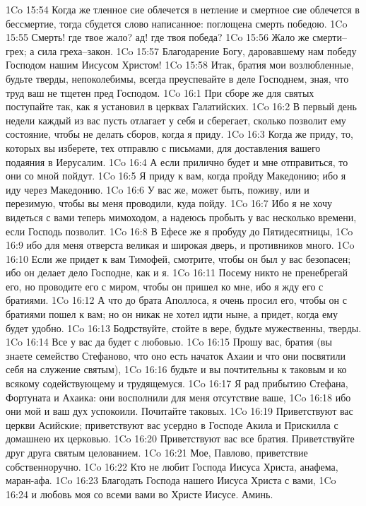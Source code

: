 1Co 15:54  Когда же тленное сие облечется в нетление и смертное сие облечется в бессмертие, тогда сбудется слово написанное: поглощена смерть победою.
1Co 15:55  Смерть! где твое жало? ад! где твоя победа?
1Co 15:56  Жало же смерти--грех; а сила греха--закон.
1Co 15:57  Благодарение Богу, даровавшему нам победу Господом нашим Иисусом Христом!
1Co 15:58  Итак, братия мои возлюбленные, будьте тверды, непоколебимы, всегда преуспевайте в деле Господнем, зная, что труд ваш не тщетен пред Господом.
1Co 16:1  При сборе же для святых поступайте так, как я установил в церквах Галатийских.
1Co 16:2  В первый день недели каждый из вас пусть отлагает у себя и сберегает, сколько позволит ему состояние, чтобы не делать сборов, когда я приду.
1Co 16:3  Когда же приду, то, которых вы изберете, тех отправлю с письмами, для доставления вашего подаяния в Иерусалим.
1Co 16:4  А если прилично будет и мне отправиться, то они со мной пойдут.
1Co 16:5  Я приду к вам, когда пройду Македонию; ибо я иду через Македонию.
1Co 16:6  У вас же, может быть, поживу, или и перезимую, чтобы вы меня проводили, куда пойду.
1Co 16:7  Ибо я не хочу видеться с вами теперь мимоходом, а надеюсь пробыть у вас несколько времени, если Господь позволит.
1Co 16:8  В Ефесе же я пробуду до Пятидесятницы,
1Co 16:9  ибо для меня отверста великая и широкая дверь, и противников много.
1Co 16:10  Если же придет к вам Тимофей, смотрите, чтобы он был у вас безопасен; ибо он делает дело Господне, как и я.
1Co 16:11  Посему никто не пренебрегай его, но проводите его с миром, чтобы он пришел ко мне, ибо я жду его с братиями.
1Co 16:12  А что до брата Аполлоса, я очень просил его, чтобы он с братиями пошел к вам; но он никак не хотел идти ныне, а придет, когда ему будет удобно.
1Co 16:13  Бодрствуйте, стойте в вере, будьте мужественны, тверды.
1Co 16:14  Все у вас да будет с любовью.
1Co 16:15  Прошу вас, братия (вы знаете семейство Стефаново, что оно есть начаток Ахаии и что они посвятили себя на служение святым),
1Co 16:16  будьте и вы почтительны к таковым и ко всякому содействующему и трудящемуся.
1Co 16:17  Я рад прибытию Стефана, Фортуната и Ахаика: они восполнили для меня отсутствие ваше,
1Co 16:18  ибо они мой и ваш дух успокоили. Почитайте таковых.
1Co 16:19  Приветствуют вас церкви Асийские; приветствуют вас усердно в Господе Акила и Прискилла с домашнею их церковью.
1Co 16:20  Приветствуют вас все братия. Приветствуйте друг друга святым целованием.
1Co 16:21  Мое, Павлово, приветствие собственноручно.
1Co 16:22  Кто не любит Господа Иисуса Христа, анафема, маран-афа.
1Co 16:23  Благодать Господа нашего Иисуса Христа с вами,
1Co 16:24  и любовь моя со всеми вами во Христе Иисусе. Аминь.


